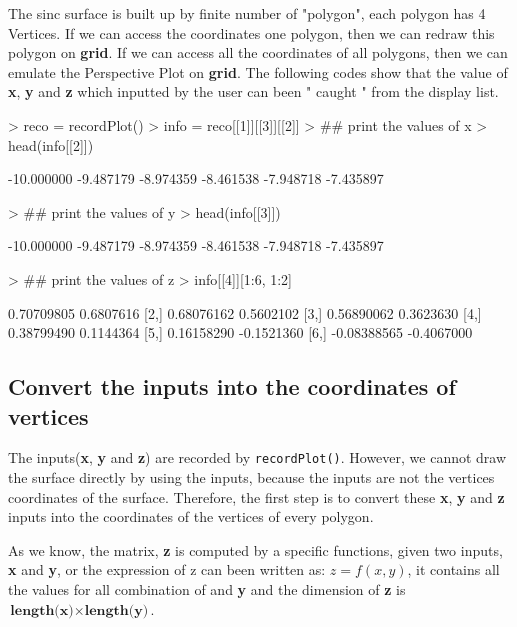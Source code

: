 \documentclass[11pt]{report}
\begin{document}
\newpage
The sinc surface is built up by finite number of "polygon", each polygon has 4 Vertices.
If we can access the coordinates one polygon, then we can redraw this polygon on \textbf{grid}. If we can access all the coordinates of all polygons, then we can emulate the Perspective Plot on \textbf{grid}. The following codes show that the value of \textbf{x}, \textbf{y} and \textbf{z} which inputted by the user can been " caught " from the display list.
\begin{Schunk}
\begin{Sinput}
> reco = recordPlot()
> info = reco[[1]][[3]][[2]]
> ## print the values of x
> head(info[[2]])
\end{Sinput}
\begin{Soutput}
[1] -10.000000  -9.487179  -8.974359  -8.461538  -7.948718  -7.435897
\end{Soutput}
\begin{Sinput}
> ## print the values of y
> head(info[[3]])
\end{Sinput}
\begin{Soutput}
[1] -10.000000  -9.487179  -8.974359  -8.461538  -7.948718  -7.435897
\end{Soutput}
\begin{Sinput}
> ## print the values of z
> info[[4]][1:6, 1:2]
\end{Sinput}
\begin{Soutput}
            [,1]       [,2]
[1,]  0.70709805  0.6807616
[2,]  0.68076162  0.5602102
[3,]  0.56890062  0.3623630
[4,]  0.38799490  0.1144364
[5,]  0.16158290 -0.1521360
[6,] -0.08388565 -0.4067000
\end{Soutput}
\end{Schunk}
\subsection{Convert the inputs into the coordinates of vertices}
The inputs(\textbf{x}, \textbf{y} and \textbf{z}) are recorded by \texttt{recordPlot()}. However, we cannot draw the surface directly by using the inputs, because the inputs are not the vertices coordinates of the surface. Therefore, the first step is to convert these \textbf{x}, \textbf{y} and \textbf{z} inputs into the coordinates of the vertices of every polygon.


As we know, the matrix, \textbf{z} is computed by a specific functions, given two inputs, \textbf{x} and \textbf{y}, or the expression of z can been written as: $z = f(x,y)$, it contains all the values for all combination of  and \textbf{y} and the dimension of \textbf{z} is $ \textbf{length(x)} \times \textbf{length(y)}$.\\
\end{document}
